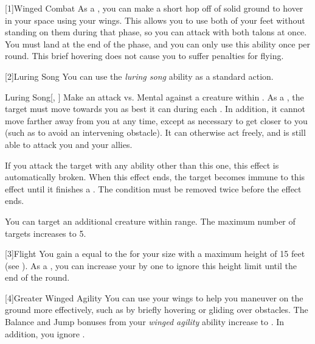             [1]{Winged Combat} As a , you can make a short hop off of solid ground to hover in your space using your wings.
            This allows you to use both of your feet without standing on them during that phase, so you can attack with both talons at once.
            You must land at the end of the phase, and you can only use this ability once per round.
            This brief hovering does not cause you to suffer penalties for flying.

            [2]{Luring Song} You can use the \textit{luring song} ability as a standard action.
            \begin{magicalactiveability}{Luring Song}[, ]
                    \rankline
                    Make an attack vs. Mental against a creature within \longrange.
                    \hit As a , the target must move towards you as best it can during each .
                    In addition, it cannot move farther away from you at any time, except as necessary to get closer to you (such as to avoid an intervening obstacle).
                    It can otherwise act freely, and is still able to attack you and your allies.

                    If you attack the target with any ability other than this one, this effect is automatically broken.
                    When this effect ends, the target becomes immune to this effect until it finishes a .
                    \crit The condition must be removed twice before the effect ends.

                    \rankline
                     You can target an additional creature within range.
                     The maximum number of targets increases to 5.
                \end{magicalactiveability}

            [3]{Flight} You gain a  equal to the  for your size with a maximum height of 15 feet (see ).
            As a , you can increase your  by one to ignore this height limit until the end of the round.

            [4]{Greater Winged Agility} You can use your wings to help you maneuver on the ground more effectively, such as by briefly hovering or gliding over obstacles.
            The Balance and Jump bonuses from your \textit{winged agility} ability increase to .
            In addition, you ignore .

